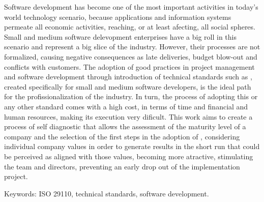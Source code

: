 Software development has become one of the most important activities in today's world technology scenario, because applications and information systems permeate all economic activities, reaching, or at least afecting, all social spheres. Small and medium software delevopment enterprises have a big roll in this scenario and represent a big slice of the industry. However, their processes are not formalized, causing negative consequences as late deliveries, budget blow-out and conflicts with customers. The adoption of good practices in project management and software development through introduction of technical standards such as \iso, created specifically for small and medium software developers, is the ideal path for the profissionalization of the industry. In turn, the process of adopting this or any other standard comes with a high cost, in terms of time and financial and human resources, making its execution very dificult. This work aims to create a process of self diagnostic that allows the assessment of the maturity level of a company and the selection of the first steps in the adoption of \iso, considering individual company values in order to generate results in the short run that could be perceived as aligned with those values, becoming more atractive, stimulating the team and directors, preventing an early drop out of the implementation project.

Keywords: ISO 29110, technical standards, software development.